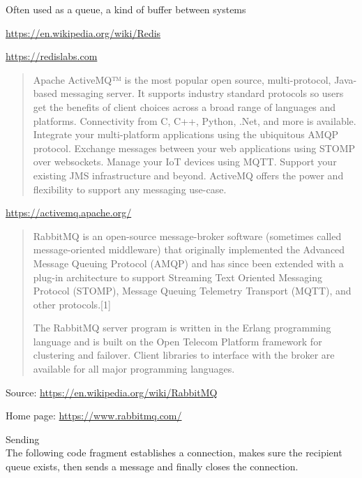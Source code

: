 \documentclass[Screen16to9,17pt]{foils}
\begin{document}
\begin{list2}
\item Often used as a queue, a kind of buffer between systems
\item \url{https://en.wikipedia.org/wiki/Redis}
\item \url{https://redislabs.com}
\end{list2}



\begin{quote}
Apache ActiveMQ™ is the most popular open source, multi-protocol, Java-based messaging server. It supports industry standard protocols so users get the benefits of client choices across a broad range of languages and platforms. Connectivity from C, C++, Python, .Net, and more is available. Integrate your multi-platform applications using the ubiquitous AMQP protocol. Exchange messages between your web applications using STOMP over websockets. Manage your IoT devices using MQTT. Support your existing JMS infrastructure and beyond. ActiveMQ offers the power and flexibility to support any messaging use-case.
\end{quote}

\url{https://activemq.apache.org/}




\begin{quote}
RabbitMQ is an open-source message-broker software (sometimes called message-oriented middleware) that originally implemented the Advanced Message Queuing Protocol (AMQP) and has since been extended with a plug-in architecture to support Streaming Text Oriented Messaging Protocol (STOMP), Message Queuing Telemetry Transport (MQTT), and other protocols.[1]

The RabbitMQ server program is written in the Erlang programming language and is built on the Open Telecom Platform framework for clustering and failover. Client libraries to interface with the broker are available for all major programming languages.
\end{quote}

Source: \url{https://en.wikipedia.org/wiki/RabbitMQ}

Home page: \url{https://www.rabbitmq.com/}




Sending\\
The following code fragment establishes a connection, makes sure the recipient queue exists, then sends a message and finally closes the connection.
\end{document}
